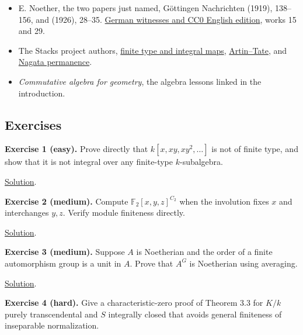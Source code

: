 \documentclass[
]{article}
\providecommand{\tightlist}{%
  \setlength{\itemsep}{0pt}\setlength{\parskip}{0pt}}
\begin{document}
\begin{itemize}
\tightlist
\item
  E. Noether, the two papers just named, Göttingen Nachrichten (1919),
  138--156, and (1926), 28--35.
  \href{https://github.com/KokunoYumeto/emmy-noether-en}{German
  witnesses and CC0 English edition}, works 15 and 29.
\item
  The Stacks project authors,
  \href{https://kokunoyumeto.github.io/stacks-zh-hans-cn/en/algebra.html\#lemma-characterize-finite-in-terms-of-integral}{finite
  type and integral maps},
  \href{https://kokunoyumeto.github.io/stacks-zh-hans-cn/en/algebra.html\#lemma-Artin-Tate}{Artin--Tate},
  and
  \href{https://kokunoyumeto.github.io/stacks-zh-hans-cn/en/algebra.html\#proposition-ubiquity-nagata}{Nagata
  permanence}.
\item
  \emph{Commutative algebra for geometry}, the algebra lessons linked in
  the introduction.
\end{itemize}

\subsection{Exercises}\label{exercises}

\protect{}\label{exercise-1}{}

\textbf{Exercise 1 (easy).} Prove directly that \(k [x,xy,xy^2,\ldots]\)
is not of finite type, and show that it is not integral over any
finite-type \(k\)-subalgebra.

\hyperref[solution-1]{Solution}.

\protect{}\label{exercise-2}{}

\textbf{Exercise 2 (medium).} Compute \(\mathbb F_2 [x,y,z]^{C_2}\) when
the involution fixes \(x\) and interchanges \(y,z\). Verify module
finiteness directly.

\hyperref[solution-2]{Solution}.

\protect{}\label{exercise-3}{}

\textbf{Exercise 3 (medium).} Suppose \(A\) is Noetherian and the order
of a finite automorphism group is a unit in \(A\). Prove that \(A^G\) is
Noetherian using averaging.

\hyperref[solution-3]{Solution}.

\protect{}\label{exercise-4}{}

\textbf{Exercise 4 (hard).} Give a characteristic-zero proof of Theorem
3.3 for \(K/k\) purely transcendental and \(S\) integrally closed that
avoids general finiteness of inseparable normalization.
\end{document}
